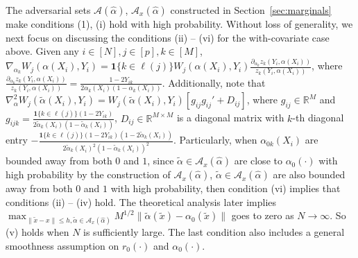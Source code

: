 \documentclass[11pt]{article}
\begin{document}
The adversarial sets $\mathcal{A}(\hat{\alpha})$, $\mathcal{A}_x(\hat{\alpha})$ constructed in Section~\ref{sec:marginals} make conditions (1), (i) hold with high probability. Without loss of generality, we next focus on discussing the conditions (ii) -- (vi) for the with-covariate case above. Given any $i\in[N],j\in[p],k\in[M]$, $\nabla_{\alpha_k}W_j(\alpha(X_i),Y_i)=\mathbf{1}\{k\in\ell(j)\}W_j(\alpha(X_i),Y_i)\frac{\partial_{\alpha_k}z_k(Y_i,\alpha(X_i))}{z_k(Y_i,\alpha(X_i))}$, where $\frac{\partial_{\alpha_k}z_k(Y_i,\alpha(X_i))}{z_k(Y_i,\alpha(X_i))}=\frac{1-2Y_{ik}}{2\alpha_{k}(X_i)(1-\alpha_{k}(X_i))}$. Additionally, note that $\nabla_{\alpha}^2W_j(\tilde{\alpha}(X_i),Y_i)=W_j(\tilde{\alpha}(X_i),Y_i)[g_{ij}g_{ij}'+D_{ij}]$, where $g_{ij}\in\mathbb{R}^M$ and $g_{ijk}=\frac{\mathbf{1}\{k\in\ell(j)\}(1-2Y_{ik})}{2\tilde{\alpha}_k(X_i)(1-\tilde{\alpha}_k(X_i))}$, $D_{ij}\in\mathbb{R}^{M\times M}$ is a diagonal matrix with $k$-th diagonal entry $-\frac{\mathbf{1}\{k\in\ell(j)\}(1-2Y_{ik})(1-2\tilde{\alpha}_k(X_i))}{2\tilde{\alpha}_k(X_i)^2(1-\tilde{\alpha}_k(X_i))^2}$. Particularly, when $\alpha_{0k}(X_i)$ are bounded away from both $0$ and $1$, since $\tilde{\alpha}\in\mathcal{A}_x(\hat{\alpha})$ are close to $\alpha_0(\cdot)$ with high probability by the construction of $\mathcal{A}_x(\hat{\alpha})$, $\tilde{\alpha}\in\mathcal{A}_x(\hat{\alpha})$ are also bounded away from both $0$ and $1$ with high probability, then condition (vi) implies that conditions (ii) -- (iv) hold. The theoretical analysis later implies ${\displaystyle \max_{\|\tilde x-x\|\leq h, \tilde\alpha \in \mathcal{A}_x(\hat\alpha)}}M^{1/2}\|\tilde \alpha(\tilde x)-\alpha_0(\tilde x)\|$ goes to zero as $N\rightarrow\infty$. So (v) holds when $N$ is sufficiently large. The last condition also includes a general smoothness assumption on $r_0(\cdot)$ and $\alpha_0(\cdot)$. 
\end{document}
